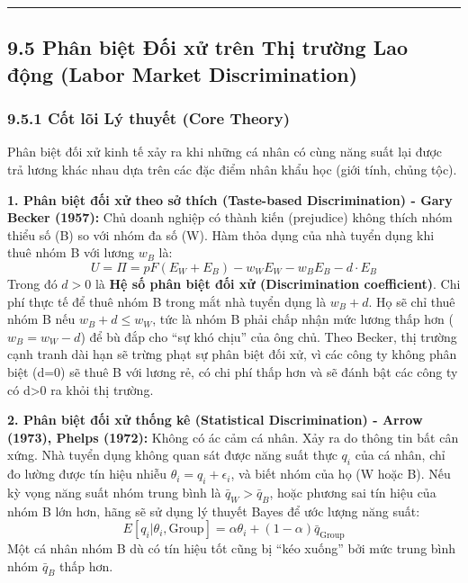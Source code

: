 \documentclass[
]{article}
\begin{document}
\begin{center}\rule{0.5\linewidth}{0.5pt}\end{center}

\subsection{9.5 Phân biệt Đối xử trên Thị trường Lao động (Labor Market
Discrimination)}\label{phuxe2n-biux1ec7t-ux111ux1ed1i-xux1eed-truxean-thux1ecb-trux1b0ux1eddng-lao-ux111ux1ed9ng-labor-market-discrimination}

\subsubsection{9.5.1 Cốt lõi Lý thuyết (Core
Theory)}\label{cux1ed1t-luxf5i-luxfd-thuyux1ebft-core-theory-36}

Phân biệt đối xử kinh tế xảy ra khi những cá nhân có cùng năng suất lại
được trả lương khác nhau dựa trên các đặc điểm nhân khẩu học (giới tính,
chủng tộc).

\textbf{1. Phân biệt đối xử theo sở thích (Taste-based Discrimination) -
Gary Becker (1957):} Chủ doanh nghiệp có thành kiến (prejudice) không
thích nhóm thiểu số (B) so với nhóm đa số (W). Hàm thỏa dụng của nhà
tuyển dụng khi thuê nhóm B với lương \(w_B\) là:
\[ U = \Pi = pF(E_W + E_B) - w_W E_W - w_B E_B - d \cdot E_B \] Trong đó
\(d > 0\) là \textbf{Hệ số phân biệt đối xử (Discrimination
coefficient)}. Chi phí thực tế để thuê nhóm B trong mắt nhà tuyển dụng
là \(w_B + d\). Họ sẽ chỉ thuê nhóm B nếu \(w_B + d \leq w_W\), tức là
nhóm B phải chấp nhận mức lương thấp hơn (\(w_B = w_W - d\)) để bù đắp
cho ``sự khó chịu'' của ông chủ. Theo Becker, thị trường cạnh tranh dài
hạn sẽ trừng phạt sự phân biệt đối xử, vì các công ty không phân biệt
(d=0) sẽ thuê B với lương rẻ, có chi phí thấp hơn và sẽ đánh bật các
công ty có d\textgreater0 ra khỏi thị trường.

\textbf{2. Phân biệt đối xử thống kê (Statistical Discrimination) -
Arrow (1973), Phelps (1972):} Không có ác cảm cá nhân. Xảy ra do thông
tin bất cân xứng. Nhà tuyển dụng không quan sát được năng suất thực
\(q_i\) của cá nhân, chỉ đo lường được tín hiệu nhiễu
\(\theta_i = q_i + \epsilon_i\), và biết nhóm của họ (W hoặc B). Nếu kỳ
vọng năng suất nhóm trung bình là \(\bar{q}_W > \bar{q}_B\), hoặc phương
sai tín hiệu của nhóm B lớn hơn, hãng sẽ sử dụng lý thuyết Bayes để ước
lượng năng suất:
\[ E[q_i | \theta_i, \text{Group}] = \alpha \theta_i + (1-\alpha) \bar{q}_{\text{Group}} \]
Một cá nhân nhóm B dù có tín hiệu tốt cũng bị ``kéo xuống'' bởi mức
trung bình nhóm \(\bar{q}_B\) thấp hơn.
\end{document}
